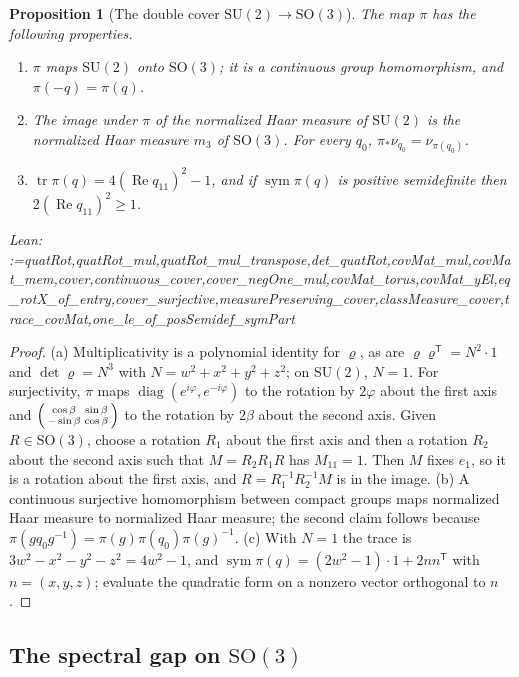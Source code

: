 \documentclass[11pt]{amsart}
\makeatletter
\newtheorem{proposition}[theorem]{Proposition}
\theoremstyle{definition}
\theoremstyle{remark}
\newcommand{\@leanlist}[1]{\def\@leansep{}\@for\@leanname:=#1\do{\@leansep
  \texttt{\expandafter\detokenize\expandafter{\@leanname}}\def\@leansep{, }}}
\newcommand{\lean}[1]{\par\smallskip\noindent
  {\footnotesize\normalfont\raggedright\textsf{Lean:} \@leanlist{#1}\par}}
\newcommand{\SO}{\mathrm{SO}}
\newcommand{\tr}{\operatorname{tr}}
\newcommand{\sym}{\operatorname{sym}}
\newcommand{\re}{\operatorname{Re}}
\newcommand{\transp}{^{\mathsf T}}
\makeatother
\begin{document}
\begin{proposition}[The double cover $\mathrm{SU}(2)\to\SO(3)$]\label{prop:cover}
The map $\pi$ has the following properties.
\begin{enumerate}
\item[(a)] $\pi$ maps $\mathrm{SU}(2)$ onto $\SO(3)$; it is a continuous group homomorphism,
and $\pi(-q)=\pi(q)$.
\item[(b)] The image under $\pi$ of the normalized Haar measure of $\mathrm{SU}(2)$ is the
normalized Haar measure $m_3$ of $\SO(3)$.  For every $q_0$,
$\pi_*\nu_{q_0}=\nu_{\pi(q_0)}$.
\item[(c)] $\tr\pi(q)=4(\re q_{11})^2-1$, and if $\sym\pi(q)$ is positive semidefinite then
$2(\re q_{11})^2\ge1$.
\end{enumerate}
\lean{quatRot,quatRot_mul,quatRot_mul_transpose,det_quatRot,covMat_mul,covMat_mem,cover,continuous_cover,cover_negOne_mul,covMat_torus,covMat_yEl,eq_rotX_of_entry,cover_surjective,measurePreserving_cover,classMeasure_cover,trace_covMat,one_le_of_posSemidef_symPart}
\end{proposition}

\begin{proof}
(a) Multiplicativity is a polynomial identity for $\varrho$, as are
$\varrho\varrho\transp=N^2\cdot1$ and $\det\varrho=N^3$ with $N=w^2+x^2+y^2+z^2$; on
$\mathrm{SU}(2)$, $N=1$.  For surjectivity, $\pi$ maps
$\operatorname{diag}(e^{i\varphi},e^{-i\varphi})$ to the rotation by $2\varphi$ about the first
axis and $\begin{psmallmatrix}\cos\beta&\sin\beta\\-\sin\beta&\cos\beta\end{psmallmatrix}$ to the
rotation by $2\beta$ about the second axis.  Given $R\in\SO(3)$, choose a rotation $R_1$ about
the first axis and then a rotation $R_2$ about the second axis such that $M=R_2R_1R$ has
$M_{11}=1$.  Then $M$ fixes $e_1$, so it is a rotation about the first axis, and
$R=R_1^{-1}R_2^{-1}M$ is in the image.  (b) A continuous surjective homomorphism between compact
groups maps normalized Haar measure to normalized Haar measure; the second claim follows because
$\pi(gq_0g^{-1})=\pi(g)\pi(q_0)\pi(g)^{-1}$.  (c) With $N=1$ the trace is $3w^2-x^2-y^2-z^2
=4w^2-1$, and $\sym\pi(q)=(2w^2-1)\cdot1+2nn\transp$ with $n=(x,y,z)$; evaluate the quadratic
form on a nonzero vector orthogonal to $n$.
\end{proof}

\subsection{The spectral gap on \texorpdfstring{$\SO(3)$}{SO(3)}}\label{sec:so3-gap}
\end{document}
